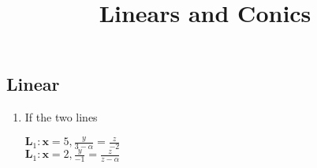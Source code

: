 \documentclass{article}
\let\vec\mathbf{}
\begin{document}
\begin{center}
\title{ Linears and Conics}
\date{}
\maketitle
\section{Linear}     
\end{center}
\begin{enumerate}
    \item If the two lines
    \begin{center}
        $\vec{L}_1 : \vec{x}=5,\frac{y}{3-\alpha}=\frac{z}{-2}$\\
        $\vec{L}_1 : \vec{x}=2,\frac{y}{-1}=\frac{z}{z-\alpha}$\\
        

\end{center}
\end{enumerate}
\end{document}
